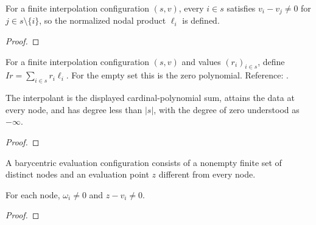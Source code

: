 \begin{supporting}
\begin{theorem}
\label{thm:lagrange-interpolation-input}
\leanok
For a finite interpolation configuration $(s,v)$, every $i\in s$
satisfies $v_i-v_j\ne0$ for $j\in s\setminus\{i\}$, so the normalized
nodal product $\ell_i$ is defined.
\end{theorem}
\begin{proof}
\leanok
\end{proof}

\begin{definition}
\label{def:lagrange-interpolant}
\leanok
For a finite interpolation configuration $(s,v)$ and values $(r_i)_{i\in s}$, define
$I r=\sum_{i\in s}r_i\ell_i$. For the empty set this is the zero polynomial.
Reference: \cite[3.3(i)]{dlmf}.
\end{definition}

\begin{theorem}
\label{thm:lagrange-interpolant}
\leanok
The interpolant is the displayed cardinal-polynomial sum, attains the data
at every node, and has degree less than $|s|$, with the degree of zero
understood as $-\infty$.
\end{theorem}
\begin{proof}
\leanok
\end{proof}

\begin{definition}
\label{def:barycentric-input}
\leanok
A barycentric evaluation configuration consists of a nonempty finite set of distinct nodes and
an evaluation point $z$ different from every node.
\end{definition}

\begin{theorem}
\label{thm:barycentric-input}
\leanok
For each node, $\omega_i\ne0$ and $z-v_i\ne0$.
\end{theorem}
\begin{proof}
\leanok
\end{proof}

\end{supporting}

